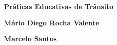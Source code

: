 \thispagestyle{empty}

\begin{center}

\vspace*{\fill}

\textbf{\color{verde_UnB}\fontsize{30pt}{35pt}\selectfont \textbf{Práticas Educativas de Trânsito}}


\vfill

{\textbf{\fontsize{13pt}{15.6pt}\selectfont \centering  Mário Diego Rocha Valente}}

\vspace{1cm}

{\textbf{\fontsize{13pt}{15.6pt}\selectfont \centering  Marcelo Santos}}

\vspace*{\fill}

\end{center}

\newpage